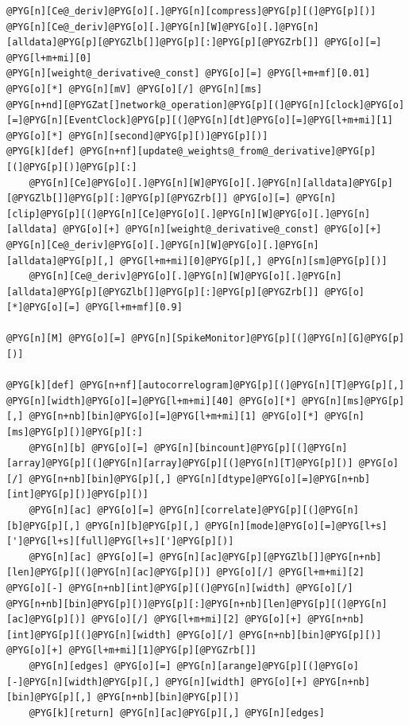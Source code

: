 \documentclass[letterpaper,10pt,english]{manual}
\begin{document}
\begin{Verbatim}[commandchars=@\[\]]
@PYG[n][Ce@_deriv]@PYG[o][.]@PYG[n][compress]@PYG[p][(]@PYG[p][)]
@PYG[n][Ce@_deriv]@PYG[o][.]@PYG[n][W]@PYG[o][.]@PYG[n][alldata]@PYG[p][@PYGZlb[]]@PYG[p][:]@PYG[p][@PYGZrb[]] @PYG[o][=] @PYG[l+m+mi][0]
@PYG[n][weight@_derivative@_const] @PYG[o][=] @PYG[l+m+mf][0.01] @PYG[o][*] @PYG[n][mV] @PYG[o][/] @PYG[n][ms]
@PYG[n+nd][@PYGZat[]network@_operation]@PYG[p][(]@PYG[n][clock]@PYG[o][=]@PYG[n][EventClock]@PYG[p][(]@PYG[n][dt]@PYG[o][=]@PYG[l+m+mi][1] @PYG[o][*] @PYG[n][second]@PYG[p][)]@PYG[p][)]
@PYG[k][def] @PYG[n+nf][update@_weights@_from@_derivative]@PYG[p][(]@PYG[p][)]@PYG[p][:]
    @PYG[n][Ce]@PYG[o][.]@PYG[n][W]@PYG[o][.]@PYG[n][alldata]@PYG[p][@PYGZlb[]]@PYG[p][:]@PYG[p][@PYGZrb[]] @PYG[o][=] @PYG[n][clip]@PYG[p][(]@PYG[n][Ce]@PYG[o][.]@PYG[n][W]@PYG[o][.]@PYG[n][alldata] @PYG[o][+] @PYG[n][weight@_derivative@_const] @PYG[o][+] @PYG[n][Ce@_deriv]@PYG[o][.]@PYG[n][W]@PYG[o][.]@PYG[n][alldata]@PYG[p][,] @PYG[l+m+mi][0]@PYG[p][,] @PYG[n][sm]@PYG[p][)]
    @PYG[n][Ce@_deriv]@PYG[o][.]@PYG[n][W]@PYG[o][.]@PYG[n][alldata]@PYG[p][@PYGZlb[]]@PYG[p][:]@PYG[p][@PYGZrb[]] @PYG[o][*]@PYG[o][=] @PYG[l+m+mf][0.9]

@PYG[n][M] @PYG[o][=] @PYG[n][SpikeMonitor]@PYG[p][(]@PYG[n][G]@PYG[p][)]

@PYG[k][def] @PYG[n+nf][autocorrelogram]@PYG[p][(]@PYG[n][T]@PYG[p][,] @PYG[n][width]@PYG[o][=]@PYG[l+m+mi][40] @PYG[o][*] @PYG[n][ms]@PYG[p][,] @PYG[n+nb][bin]@PYG[o][=]@PYG[l+m+mi][1] @PYG[o][*] @PYG[n][ms]@PYG[p][)]@PYG[p][:]
    @PYG[n][b] @PYG[o][=] @PYG[n][bincount]@PYG[p][(]@PYG[n][array]@PYG[p][(]@PYG[n][array]@PYG[p][(]@PYG[n][T]@PYG[p][)] @PYG[o][/] @PYG[n+nb][bin]@PYG[p][,] @PYG[n][dtype]@PYG[o][=]@PYG[n+nb][int]@PYG[p][)]@PYG[p][)]
    @PYG[n][ac] @PYG[o][=] @PYG[n][correlate]@PYG[p][(]@PYG[n][b]@PYG[p][,] @PYG[n][b]@PYG[p][,] @PYG[n][mode]@PYG[o][=]@PYG[l+s][']@PYG[l+s][full]@PYG[l+s][']@PYG[p][)]
    @PYG[n][ac] @PYG[o][=] @PYG[n][ac]@PYG[p][@PYGZlb[]]@PYG[n+nb][len]@PYG[p][(]@PYG[n][ac]@PYG[p][)] @PYG[o][/] @PYG[l+m+mi][2] @PYG[o][-] @PYG[n+nb][int]@PYG[p][(]@PYG[n][width] @PYG[o][/] @PYG[n+nb][bin]@PYG[p][)]@PYG[p][:]@PYG[n+nb][len]@PYG[p][(]@PYG[n][ac]@PYG[p][)] @PYG[o][/] @PYG[l+m+mi][2] @PYG[o][+] @PYG[n+nb][int]@PYG[p][(]@PYG[n][width] @PYG[o][/] @PYG[n+nb][bin]@PYG[p][)] @PYG[o][+] @PYG[l+m+mi][1]@PYG[p][@PYGZrb[]]
    @PYG[n][edges] @PYG[o][=] @PYG[n][arange]@PYG[p][(]@PYG[o][-]@PYG[n][width]@PYG[p][,] @PYG[n][width] @PYG[o][+] @PYG[n+nb][bin]@PYG[p][,] @PYG[n+nb][bin]@PYG[p][)]
    @PYG[k][return] @PYG[n][ac]@PYG[p][,] @PYG[n][edges]


\end{Verbatim}
\end{document}
